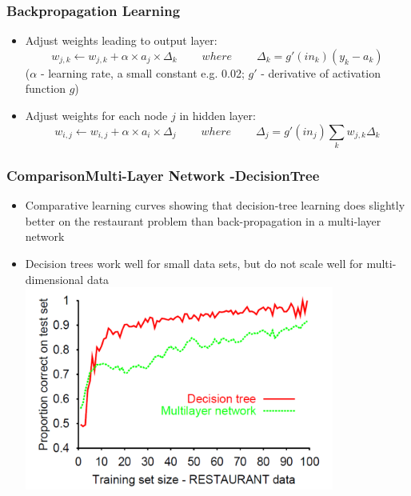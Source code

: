 \documentclass[conference]{styles/acmsiggraph}
\begin{document}
        \subsubsection{Backpropagation Learning}
            \begin{itemize}
                \item Adjust weights leading to output layer:
                $$w_{j,k} \leftarrow w_{j,k} + \alpha \times a_j \times \Delta_k\ \ \ \ \ \ \ \ \ \ where\ \ \ \ \ \ \ \ \ \ \Delta_k = g'(in_k)(y_k - a_k)$$
                ($\alpha$ - learning rate, a small constant e.g. 0.02; $g'$ - derivative of activation function $g$)
                \item Adjust weights for each node $j$ in hidden layer:
                $$w_{i,j} \leftarrow w_{i,j} + \alpha \times a_i \times \Delta_j\ \ \ \ \ \ \ \ \ \ where\ \ \ \ \ \ \ \ \ \ \Delta_j = g'(in_j) \sum\limits_{k} w_{j,k} \Delta_k$$
            \end{itemize}
        
        
    
    
    
        \subsubsection{ComparisonMulti-Layer Network -DecisionTree}
            \begin{itemize}
                \item Comparative learning curves showing that decision-tree learning does slightly better on the restaurant problem than back-propagation in a multi-layer network
                \item Decision trees work well for small data sets, but do not scale well for multi-dimensional data\newline
                \includegraphics[width=0.8\textwidth]{imgs/ComparisonMultiLayerNetwork.png}
            \end{itemize}
        
\end{document}
